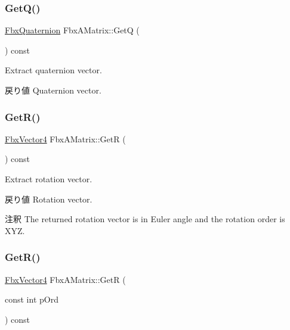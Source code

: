 \subsubsection{\texorpdfstring{Get\+Q()}{GetQ()}}
{\footnotesize\ttfamily \hyperlink{class_fbx_quaternion}{Fbx\+Quaternion} Fbx\+A\+Matrix\+::\+GetQ (\begin{DoxyParamCaption}{ }\end{DoxyParamCaption}) const}

Extract quaternion vector. \begin{DoxyReturn}{戻り値}
Quaternion vector. 
\end{DoxyReturn}
\mbox{\label{class_fbx_a_matrix_a8c5a30b339c691ecc66b1151f5e8df8b}} 
\subsubsection{\texorpdfstring{Get\+R()}{GetR()}\hspace{0.1cm}{\footnotesize\ttfamily [1/2]}}
{\footnotesize\ttfamily \hyperlink{class_fbx_vector4}{Fbx\+Vector4} Fbx\+A\+Matrix\+::\+GetR (\begin{DoxyParamCaption}{ }\end{DoxyParamCaption}) const}

Extract rotation vector. \begin{DoxyReturn}{戻り値}
Rotation vector. 
\end{DoxyReturn}
\begin{DoxyRemark}{注釈}
The returned rotation vector is in Euler angle and the rotation order is X\+YZ. 
\end{DoxyRemark}
\mbox{\label{class_fbx_a_matrix_ae36e44525e67b5a7076b9e2be733f456}} 
\subsubsection{\texorpdfstring{Get\+R()}{GetR()}\hspace{0.1cm}{\footnotesize\ttfamily [2/2]}}
{\footnotesize\ttfamily \hyperlink{class_fbx_vector4}{Fbx\+Vector4} Fbx\+A\+Matrix\+::\+GetR (\begin{DoxyParamCaption}\item[{const int}]{p\+Ord }\end{DoxyParamCaption}) const}

